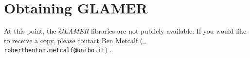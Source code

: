 \chapter{Obtaining GLAMER}
\hypertarget{copying}{}\label{copying}
\label{copying_md__s_lsim_lib_2_c_o_p_y_i_n_g}%
%


At this point, the {\itshape GLAMER} libraries are not publicly available. If you would like to receive a copy, please contact Ben Metcalf (\href{mailto:robertbenton.metcalf@unibo.it}{\texttt{ robertbenton.\+metcalf@unibo.\+it}}) . 